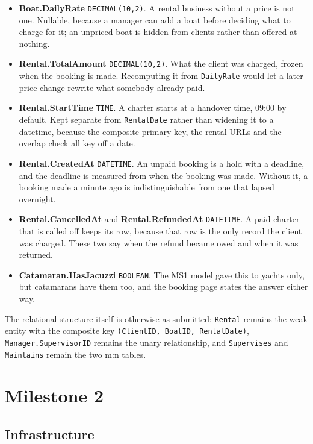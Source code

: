 \documentclass[a4paper, 11pt]{article}          %
\begin{document}
\begin{itemize}
  \item \textbf{Boat.DailyRate} \texttt{DECIMAL(10,2)}. A rental business
        without a price is not one. Nullable, because a manager can add a boat
        before deciding what to charge for it; an unpriced boat is hidden from
        clients rather than offered at nothing.
  \item \textbf{Rental.TotalAmount} \texttt{DECIMAL(10,2)}. What the client was
        charged, frozen when the booking is made. Recomputing it from
        \texttt{DailyRate} would let a later price change rewrite what somebody
        already paid.
  \item \textbf{Rental.StartTime} \texttt{TIME}. A charter starts at a handover
        time, 09:00 by default. Kept separate from \texttt{RentalDate} rather
        than widening it to a datetime, because the composite primary key, the
        rental URLs and the overlap check all key off a date.
  \item \textbf{Rental.CreatedAt} \texttt{DATETIME}. An unpaid booking is a hold
        with a deadline, and the deadline is measured from when the booking was
        made. Without it, a booking made a minute ago is indistinguishable from
        one that lapsed overnight.
  \item \textbf{Rental.CancelledAt} and \textbf{Rental.RefundedAt}
        \texttt{DATETIME}. A paid charter that is called off keeps its row,
        because that row is the only record the client was charged. These two
        say when the refund became owed and when it was returned.
  \item \textbf{Catamaran.HasJacuzzi} \texttt{BOOLEAN}. The MS1 model gave this
        to yachts only, but catamarans have them too, and the booking page
        states the answer either way.
\end{itemize}

The relational structure itself is otherwise as submitted: \texttt{Rental}
remains the weak entity with the composite key
\texttt{(ClientID, BoatID, RentalDate)}, \texttt{Manager.SupervisorID} remains
the unary relationship, and \texttt{Supervises} and \texttt{Maintains} remain
the two m:n tables.

\section{Milestone 2}
\subsection{Infrastructure}
\end{document}
